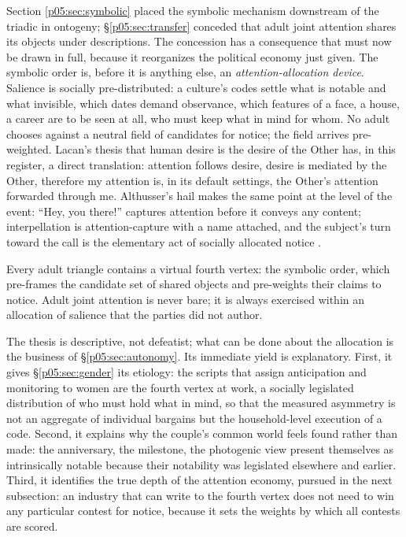 Section \ref{p05:sec:symbolic} placed the symbolic mechanism downstream of the triadic in ontogeny; §\ref{p05:sec:transfer} conceded that adult joint attention shares its objects under descriptions. The concession has a consequence that must now be drawn in full, because it reorganizes the political economy just given. The symbolic order is, before it is anything else, an \emph{attention-allocation device}. Salience is socially pre-distributed: a culture's codes settle what is notable and what invisible, which dates demand observance, which features of a face, a house, a career are to be seen at all, who must keep what in mind for whom. No adult chooses against a neutral field of candidates for notice; the field arrives pre-weighted. Lacan's thesis that human desire is the desire of the Other has, in this register, a direct translation: attention follows desire, desire is mediated by the Other, therefore my attention is, in its default settings, the Other's attention forwarded through me. Althusser's hail makes the same point at the level of the event: ``Hey, you there!'' captures attention before it conveys any content; interpellation is attention-capture with a name attached, and the subject's turn toward the call is the elementary act of socially allocated notice \parencite{althusser1971}.

\begin{prop}\label{p05:prop:fourth}
Every adult triangle contains a virtual fourth vertex: the symbolic order, which pre-frames the candidate set of shared objects and pre-weights their claims to notice. Adult joint attention is never bare; it is always exercised within an allocation of salience that the parties did not author.
\end{prop}

The thesis is descriptive, not defeatist; what can be done about the allocation is the business of §\ref{p05:sec:autonomy}. Its immediate yield is explanatory. First, it gives §\ref{p05:sec:gender} its etiology: the scripts that assign anticipation and monitoring to women are the fourth vertex at work, a socially legislated distribution of who must hold what in mind, so that the measured asymmetry \parencite{daminger2019} is not an aggregate of individual bargains but the household-level execution of a code. Second, it explains why the couple's common world feels found rather than made: the anniversary, the milestone, the photogenic view present themselves as intrinsically notable because their notability was legislated elsewhere and earlier. Third, it identifies the true depth of the attention economy, pursued in the next subsection: an industry that can write to the fourth vertex does not need to win any particular contest for notice, because it sets the weights by which all contests are scored.

